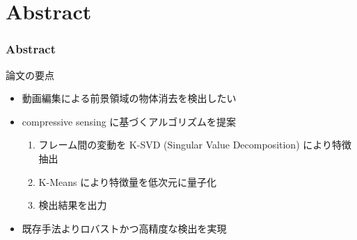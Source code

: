 \section{Abstract}
\begin{frame}\frametitle{Abstract}
論文の要点
\begin{itemize}
    \item 動画編集による前景領域の物体消去を検出したい
    \item compressive sensing に基づくアルゴリズムを提案
    \begin{enumerate}
        \item フレーム間の変動を K-SVD (Singular Value Decomposition) により特徴抽出
        \item K-Means により特徴量を低次元に量子化
        \item 検出結果を出力
    \end{enumerate}
    \item 既存手法よりロバストかつ高精度な検出を実現
\end{itemize}
\end{frame}
